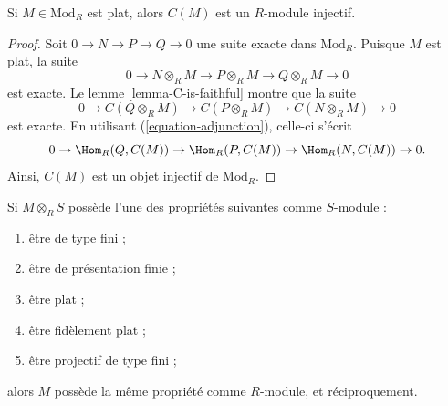 \begin{lemma}
\label{lemma-flat-to-injective}
Si $M \in \text{Mod}_R$ est plat, alors $C(M)$ est un $R$-module injectif.
\end{lemma}

\begin{proof}
Soit $0 \to N \to P \to Q \to 0$ une suite exacte dans $\text{Mod}_R$.
Puisque $M$ est plat, la suite
$$
0 \to N \otimes_R M \to P \otimes_R M \to Q \otimes_R M \to 0
$$
est exacte. Le lemme \ref{lemma-C-is-faithful} montre que la suite
$$
0 \to C(Q \otimes_R M) \to C(P \otimes_R M) \to C(N \otimes_R M) \to 0
$$
est exacte. En utilisant (\ref{equation-adjunction}), celle-ci s'écrit
$$
0 \to \Hom_R(Q, C(M)) \to \Hom_R(P, C(M)) \to \Hom_R(N, C(M)) \to 0.
$$
Ainsi, $C(M)$ est un objet injectif de $\text{Mod}_R$.
\end{proof}

\begin{theorem}
\label{theorem-descend-module-properties}
Si $M \otimes_R S$ possède l'une des propriétés suivantes comme $S$-module :
\begin{enumerate}
\item[(a)]
être de type fini ;
\item[(b)]
être de présentation finie ;
\item[(c)]
être plat ;
\item[(d)]
être fidèlement plat ;
\item[(e)]
être projectif de type fini ;
\end{enumerate}
alors $M$ possède la même propriété comme $R$-module, et réciproquement.
\end{theorem}

